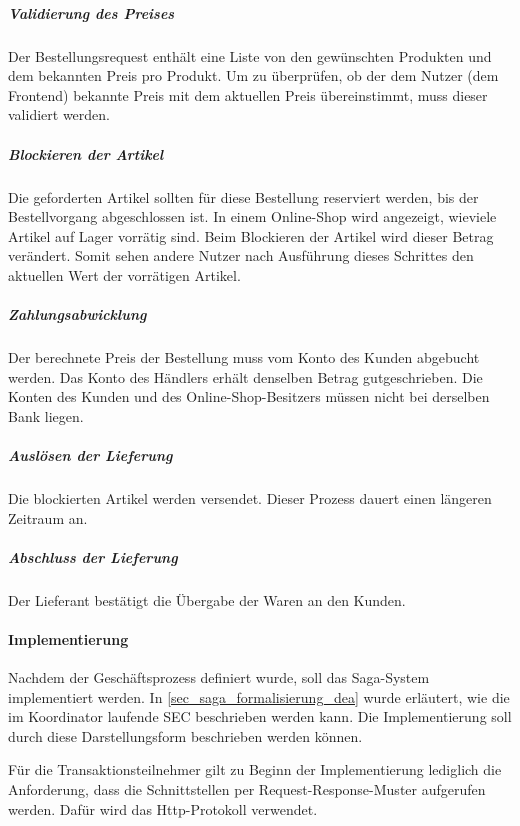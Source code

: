\subparagraph*{Validierung des Preises} Der Bestellungsrequest enthält eine Liste von den gewünschten Produkten und dem bekannten Preis pro Produkt. Um zu überprüfen, ob der dem Nutzer (dem Frontend) bekannte Preis mit dem aktuellen Preis übereinstimmt, muss dieser validiert werden. %

\subparagraph*{Blockieren der Artikel} Die geforderten Artikel sollten für diese Bestellung reserviert werden, bis der Bestellvorgang abgeschlossen ist. In einem Online-Shop wird angezeigt, wieviele Artikel auf Lager vorrätig sind. Beim Blockieren der Artikel wird dieser Betrag verändert. Somit sehen andere Nutzer nach Ausführung dieses Schrittes den aktuellen Wert der vorrätigen Artikel. 

\subparagraph*{Zahlungsabwicklung} Der berechnete Preis der Bestellung muss vom Konto des Kunden abgebucht werden. Das Konto des Händlers erhält denselben Betrag gutgeschrieben. Die Konten des Kunden und des Online-Shop-Besitzers müssen nicht bei derselben Bank liegen. 

\subparagraph*{Auslösen der Lieferung} Die blockierten Artikel werden versendet. Dieser Prozess dauert einen längeren Zeitraum an.

\subparagraph*{Abschluss der Lieferung} Der Lieferant bestätigt die Übergabe der Waren an den Kunden.


\paragraph*{Implementierung}

Nachdem der Geschäftsprozess definiert wurde, soll das Saga-System implementiert werden. In \ref{sec_saga_formalisierung_dea} wurde erläutert, wie die im Koordinator laufende SEC beschrieben werden kann. Die Implementierung soll durch diese Darstellungsform beschrieben werden können.

Für die Transaktionsteilnehmer gilt zu Beginn der Implementierung lediglich die Anforderung, dass die Schnittstellen per Request-Response-Muster aufgerufen werden. Dafür wird das Http-Protokoll verwendet.

